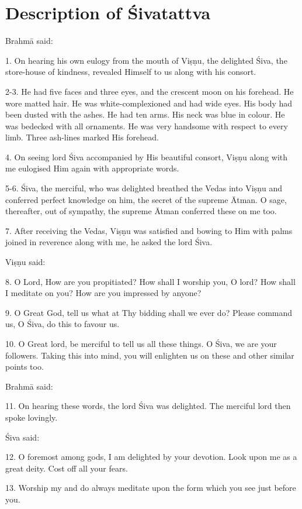 \chapter{Description of Śivatattva}

Brahmā said:

1. On hearing his own eulogy from the mouth of Viṣṇu, the delighted Śiva,
the store-house of kindness, revealed Himself to us along with his consort.

2-3. He had five faces and three eyes, and the crescent moon on his forehead.
He wore matted hair. He was white-complexioned and had wide eyes. His body had
been dusted with the ashes. He had ten arms. His neck was blue in colour. He was
bedecked with all ornaments. He was very handsome with respect to every limb.
Three ash-lines marked His forehead.

4. On seeing lord Śiva accompanied by His beautiful consort, Viṣṇu along with me
eulogised Him again with appropriate words.

5-6. Śiva, the merciful, who was delighted breathed the Vedas into Viṣṇu and
conferred perfect knowledge on him, the secret of the supreme Ātman. O sage,
thereafter, out of sympathy, the supreme Ātman conferred these on me too.

7. After receiving the Vedas, Viṣṇu was satisfied and bowing to Him with palms
joined in reverence along with me, he asked the lord Śiva.

Viṣṇu said:

8. O Lord, How are you propitiated? How shall I worship you, O lord? How shall
I meditate on you? How are you impressed by anyone?

9. O Great God, tell us what at Thy bidding shall we ever do? Please command us,
O Śiva, do this to favour us.

10. O Great lord, be merciful to tell us all these things. O Śiva, we are your
followers. Taking this into mind, you will enlighten us on these and other
similar points too.

Brahmā said:

11. On hearing these words, the lord Śiva was delighted. The merciful lord then
spoke lovingly.

Śiva said:

12. O foremost among gods, I am delighted by your devotion. Look upon me as
a great deity. Cost off all your fears.

13. Worship my  and do always meditate upon the form which you see
just before you.

